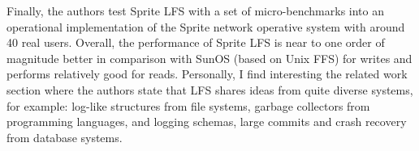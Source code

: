 \documentclass[a4paper,10pt]{scrartcl}
\begin{document}
Finally, the authors test Sprite LFS with a set of micro-benchmarks into an operational implementation of the Sprite network operative system with around 40 real users. Overall, the performance of Sprite LFS is near to one order of magnitude better in comparison with SunOS (based on Unix FFS) for writes and performs relatively good for reads.  Personally, I find interesting the related work section where the authors state that LFS shares ideas from quite diverse systems, for example: log-like structures from file systems, garbage collectors from programming languages, and logging schemas, large commits and crash recovery from database systems.

\end{document}

